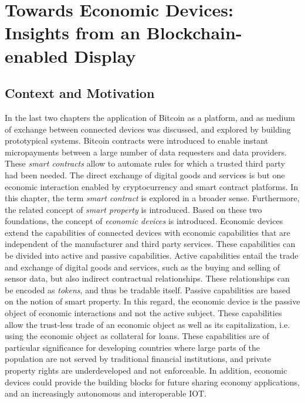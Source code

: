 \chapter{Towards Economic Devices: Insights from an Blockchain-enabled Display}
\label{sec:economicobjects}



\section{Context and Motivation}

In the last two chapters the application of Bitcoin as a platform, and as medium of exchange between connected devices was discussed, and explored by building prototypical systems. Bitcoin contracts were introduced to enable instant micropayments between a large number of data requesters and data providers. These \emph{smart contracts} allow to automate rules for which a trusted third party had been needed. The direct exchange of digital goods and services is but one economic interaction enabled by cryptocurrency and smart contract platforms. In this chapter, the term \emph{smart contract} is explored in a broader sense. Furthermore, the related concept of \emph{smart property} is introduced. Based on these two foundations, the concept of \emph{economic devices} is introduced. Economic devices extend the capabilities of connected devices with economic capabilities that are independent of the manufacturer and third party services. These capabilities can be divided into active and passive capabilities. Active capabilities entail the trade and exchange of digital goods and services, such as the buying and selling of sensor data, but also indirect contractual relationships. These relationships can be encoded as \emph{tokens}, and thus be tradable itself. Passive capabilities are based on the notion of smart property. In this regard, the economic device is the passive object of economic interactions and not the active subject. These capabilities allow the trust-less trade of an economic object as well as its capitalization, i.e. using the economic object as collateral for loans. These capabilities are of particular significance for developing countries where large parts of the population are not served by traditional financial institutions, and private property rights are underdeveloped and not enforceable. In addition, economic devices could provide the building blocks for future sharing economy applications, and an increasingly autonomous and interoperable \ac{IOT}.

